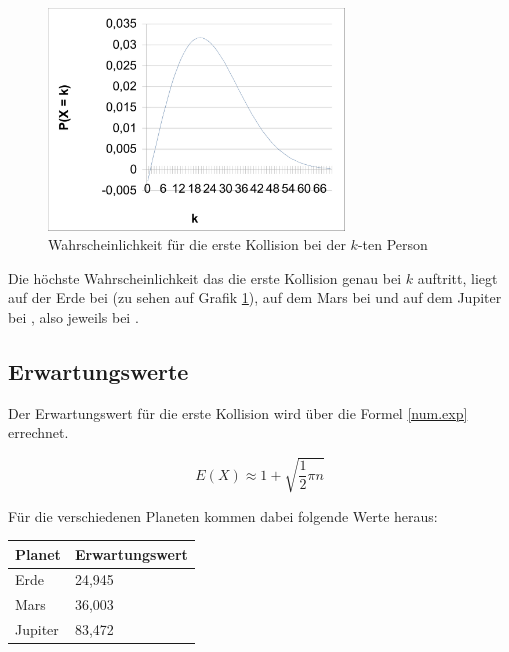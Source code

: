 \documentclass[../main.tex]{subfiles}
\begin{document}
    \begin{figure}[h]
        \begin{center}
            \includegraphics[width=0.7\textwidth]{../graphics/peq.png}
        \end{center}
        \caption{\label{num.fpeqe} Wahrscheinlichkeit für die erste Kollision bei der $k$-ten Person}
    \end{figure}



    Die höchste Wahrscheinlichkeit das die erste Kollision genau bei $k$ auftritt, liegt auf der Erde bei  (zu sehen auf Grafik \ref{num.fpeqe}), auf dem Mars bei  und auf dem Jupiter bei , also jeweils bei .

    \subsection{Erwartungswerte}

    Der Erwartungswert für die erste Kollision wird über die Formel \ref{num.exp} errechnet.

    \begin{equation}
        E(X) \approx 1 + \sqrt{\frac{1}{2} \pi n}
        \label{num.exp}
    \end{equation}

    Für die verschiedenen Planeten kommen dabei folgende Werte heraus:

    \begin{center}
        \begin{tabular}{|l|l|}
            \hline
            \textbf{Planet} & \textbf{Erwartungswert} \\ \hline
            Erde            & 24,945                  \\ \hline
            Mars            & 36,003                  \\ \hline
            Jupiter         & 83,472                  \\ \hline
        \end{tabular}
    \end{center}
\end{document}
